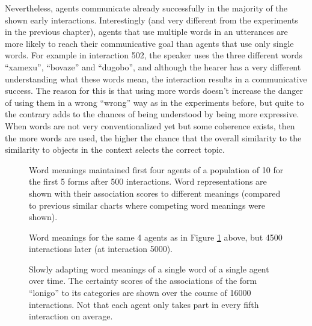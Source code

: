 Nevertheless, agents communicate already successfully in the majority
of the shown early interactions. Interestingly (and very different
from the experiments in the previous chapter), agents that use
multiple words in an utterances are more likely to reach their
communicative goal than agents that use only single words. For example
in interaction 502, the speaker uses the three different words
``xamexu'', ``bovaze'' and ``dugobo'', and although the hearer has a
very different understanding what these words mean, the interaction
results in a communicative success. The reason for this is that using
more words doesn't increase the danger of using them in a wrong
``wrong'' way as in the experiments before, but quite to the contrary
adds to the chances of being understood by being more expressive. When
words are not very conventionalized yet but some coherence exists,
then the more words are used, the higher the chance that the overall
similarity to the similarity to objects in the context selects the
correct topic.



\startfiguregroup

\begin{figure}[t]
  
  \caption{Word meanings maintained first four agents of a population
    of 10 for the first 5 forms after 500 interactions. Word
    representations are shown with their association scores to
    different meanings (compared to previous similar charts where
    competing word meanings were shown). }
  \label{f:sfwm-lexicon-forms-500}
\end{figure}

\begin{figure}[t]
  
  \caption{Word meanings for the same 4 agents as in Figure
    \ref{f:sfwm-lexicon-forms-500} above, but 4500 interactions later
    (at interaction 5000).}
  \label{f:sfwm-lexicon-forms-5000}
\end{figure}

\stopfiguregroup


\startfiguregroup

\begin{figure}[t]
  \caption{Slowly adapting word meanings of a single word of a single
    agent over time. The certainty scores of the associations of the
    form ``lonigo'' to its categories are shown over the course of
    16000 interactions. Not that each agent only takes part in every
    fifth interaction on average. }
  \label{f:sfwm-attribute-scores-1}
\end{figure}

